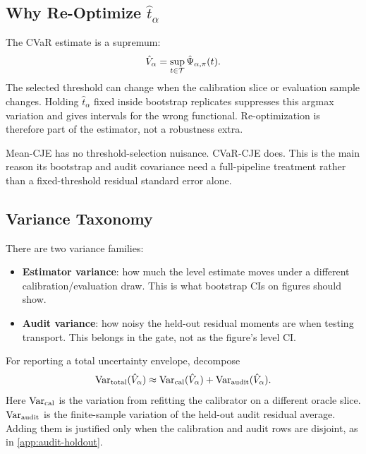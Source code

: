 \subsection{Why Re-Optimize \texorpdfstring{$\hat t_\alpha$}{t-hat}}

The CVaR estimate is a supremum:
\[
\hat V_\alpha=\sup_{t\in\mathcal{T}}\hat\Psi_{\alpha,\pi}(t).
\]
The selected threshold can change when the calibration slice or evaluation
sample changes. Holding $\hat t_\alpha$ fixed inside bootstrap replicates
suppresses this argmax variation and gives intervals for the wrong functional.
Re-optimization is therefore part of the estimator, not a robustness extra.

\begin{remark}
Mean-CJE has no threshold-selection nuisance. CVaR-CJE does. This is the main
reason its bootstrap and audit covariance need a full-pipeline treatment rather
than a fixed-threshold residual standard error alone.
\end{remark}

\subsection{Variance Taxonomy}
\label{app:variance-decomp}

There are two variance families:
\begin{itemize}[leftmargin=*,nosep]
\item \textbf{Estimator variance}: how much the level estimate moves under a
different calibration/evaluation draw. This is what bootstrap CIs on figures
should show.
\item \textbf{Audit variance}: how noisy the held-out residual moments are
when testing transport. This belongs in the gate, not as the figure's level CI.
\end{itemize}

For reporting a total uncertainty envelope, decompose
\begin{equation}
\mathrm{Var}_{\mathrm{total}}(\hat V_\alpha)
\approx
\mathrm{Var}_{\mathrm{cal}}(\hat V_\alpha)
+\mathrm{Var}_{\mathrm{audit}}(\hat V_\alpha).
\label{eq:var-total}
\end{equation}
Here $\mathrm{Var}_{\mathrm{cal}}$ is the variation from refitting the calibrator on a
different oracle slice. $\mathrm{Var}_{\mathrm{audit}}$ is the finite-sample variation
of the held-out audit residual average. Adding them is justified only when the
calibration and audit rows are disjoint, as in \cref{app:audit-holdout}.

